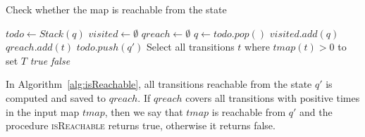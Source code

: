   \begin{algorithm}[H]
    \caption{Check whether the map is reachable from the state}\label{alg:isReachable}
    \begin{algorithmic}[1]
      \State $todo \gets Stack(q)$
      \State $visited \gets \emptyset$
      \State $qreach \gets \emptyset$
        \State $q \gets todo.pop()$
        \State $visited.add(q)$
          \State $qreach.add(t)$
            \State $todo.push(q')$
          \EndIf
        \EndFor
      \EndWhile
      \State Select all transitions $t$ where $tmap(t)>0$ to set $T$
        \State \Return \textit{true}  
      \Else 
        \State \Return \textit{false}
      \EndIf
      \EndProcedure
    \end{algorithmic}
  \end{algorithm}

  In Algorithm~\ref{alg:isReachable}, all transitions reachable from the state $q'$ is computed and saved to $qreach$. If $qreach$ covers all transitions with positive times in the input map $tmap$, then we say that $tmap$ is reachable from $q'$ and the procedure \textsc{isReachable} returns true, otherwise it returns false.  